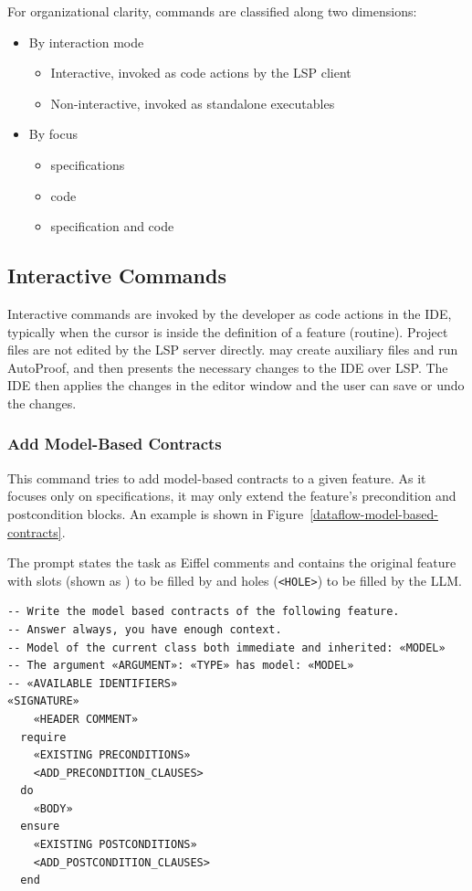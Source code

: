 \documentclass[runningheads]{llncs}
\newcommand{\figref}[1]{Figure~\ref{#1}}
\begin{document}
For organizational clarity, \toolname{} commands are classified along two dimensions:
\begin{itemize}
  \item By interaction mode
        \begin{itemize}
          \item Interactive, invoked as code actions by the LSP client
          \item Non-interactive, invoked as standalone executables
        \end{itemize}
  \item By focus
        \begin{itemize}
          \item specifications
          \item code
          \item specification and code
        \end{itemize}
\end{itemize}

\subsection{Interactive Commands}

Interactive commands are invoked by the developer as code actions in the IDE,
typically when the cursor is inside the definition of a feature (routine).
Project files are not edited by the LSP server directly. \toolname{} may create 
auxiliary files and run AutoProof, and then presents the necessary changes
to the IDE over LSP. The IDE then applies the changes in the editor window
and the user can save or undo the changes.

\subsubsection{Add Model-Based Contracts}\label{add-model-based-contracts}
This command tries to add model-based contracts to a given feature.
As it focuses only on specifications, it may only extend the feature's precondition and postcondition blocks.
An example is shown in \figref{dataflow-model-based-contracts}.


The prompt states the task as Eiffel comments and contains the original feature with slots
(shown as ) to be filled by \toolname{} and holes (\lstinline|<HOLE>|)
to be filled by the LLM.

\begin{lstlisting}
-- Write the model based contracts of the following feature.
-- Answer always, you have enough context.
-- Model of the current class both immediate and inherited: «MODEL»
-- The argument «ARGUMENT»: «TYPE» has model: «MODEL»
-- «AVAILABLE IDENTIFIERS»
«SIGNATURE»
    «HEADER COMMENT»
  require
    «EXISTING PRECONDITIONS»
    <ADD_PRECONDITION_CLAUSES>
  do
    «BODY»
  ensure
    «EXISTING POSTCONDITIONS»
    <ADD_POSTCONDITION_CLAUSES>
  end
\end{lstlisting}
\end{document}
